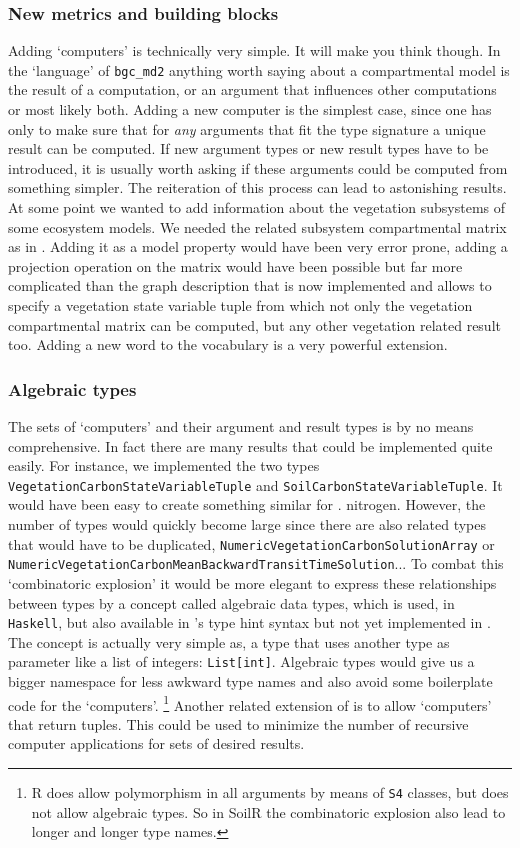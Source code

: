 \subsubsection{New metrics and building blocks}
Adding `computers' is technically very simple. It will make you think though.
In the `language' of \texttt{bgc\_md2} anything worth saying about a compartmental model is the result of a computation, or an argument that influences other computations or most likely both.
Adding a new computer is the simplest case, since one has only to make sure that for \emph{any} arguments that fit the type signature a unique result can be computed. If new argument types or new result types have to be introduced, it is usually worth asking if these arguments could be computed from something simpler. The reiteration of this process can lead to astonishing results.
At some point we wanted to add information about the vegetation subsystems of some ecosystem models. 
We needed the related subsystem compartmental matrix as in \cite{Ceballos2018Biogeosciences}. 
Adding it as a model property would have been very error prone, adding a projection operation on the matrix would have been possible but far more complicated
than the graph description that is now implemented and allows to specify a
vegetation state variable tuple from which not only the vegetation
compartmental matrix can be computed, but any other vegetation related result too. 
Adding a new word to the vocabulary is a very powerful extension.

\subsubsection{Algebraic types}
The sets of `computers' and their argument and result types is by no means comprehensive.
In fact there are many results that could be implemented quite easily. 
For instance, we implemented the two types \texttt{VegetationCarbonStateVariableTuple} and 
\texttt{SoilCarbonStateVariableTuple}. It would have been easy to create something similar for \eg. nitrogen. However, the number of types would quickly become large since there
are also related types that would have to be duplicated, \ie \texttt{NumericVegetationCarbonSolutionArray} or \texttt{NumericVegetationCarbonMeanBackwardTransitTimeSolution}...
To combat this `combinatoric explosion' it would be more elegant to express these relationships between types by a concept called
algebraic data types, which is used, \eg in  \texttt{Haskell}, but also available in \python's type hint syntax but not yet implemented in \ComputabilityGraphs{}.
The concept is actually very simple as, \eg a type that uses another type as parameter like a list of integers: \texttt{List[int]}. Algebraic types would give us a bigger namespace 
for less awkward type names and also avoid some boilerplate code for the `computers'.
\footnote{R does allow polymorphism in all arguments by means of \texttt{S4} classes, but does not allow algebraic types. So in SoilR the combinatoric explosion also lead to longer and longer type names.
}
Another related extension of \ComputabilityGraphs{} is to allow `computers' that return tuples. 
This could be used to minimize the number of recursive computer applications for sets of desired results.   

